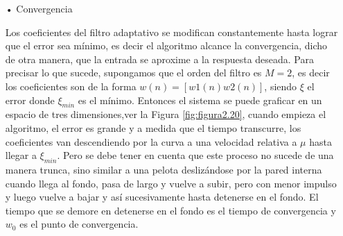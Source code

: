\begin{enumerate}
\begin{enumerate}
\item[•]Convergencia
\par
Los coeficientes del filtro adaptativo se modifican constantemente hasta lograr que el error sea mínimo, es decir el algoritmo alcance la convergencia, dicho de otra manera, que la entrada se aproxime a la respuesta deseada. Para precisar lo que sucede, supongamos que el orden del filtro es $M=2$, es decir los coeficientes son de la forma $w(n)=[w1(n) w2(n)]$, siendo $\xi$ el error donde $\xi_{min}$ es el mínimo.
\vskip 0.5cm
Entonces el sistema se puede graficar en un espacio de tres dimensiones,ver la Figura \ref{fig:figura2.20}, cuando empieza el algoritmo, el error es grande y a medida que el tiempo transcurre, los coeficientes van descendiendo por la curva a una velocidad relativa a $\mu$ hasta llegar a $\xi_{min}$. Pero se debe tener en cuenta que este proceso no sucede de una manera trunca, sino similar a una pelota deslizándose por la pared interna cuando llega al fondo, pasa de largo y vuelve a subir, pero con menor impulso y luego vuelve a bajar y así sucesivamente hasta detenerse en el fondo. El tiempo que se demore en detenerse en el fondo es el tiempo de convergencia y $w_{0}$ es el punto de convergencia.


\end{enumerate}
\end{enumerate}
